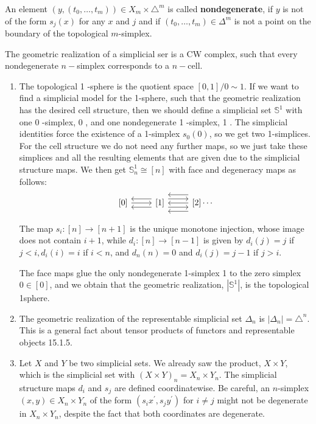 An element $\left(y,\left(t_0, \ldots, t_m\right)\right) \in X_m \times \triangle^m$ is called \textbf{nondegenerate}, if $y$ is not of the form $s_j(x)$ for any $x$ and $j$ and if $\left(t_0, \ldots, t_m\right) \in \Delta^m$ is not a point on the boundary of the topological $m$-simplex.

\begin{prop}
    The geometric realization of a simplicial ser is a CW complex, such that every nondegenerate $n-$simplex corresponds to a $n-$cell.
\end{prop}

\begin{example}
    \begin{enumerate}
        \item The topological 1 -sphere is the quotient space $[0,1] / 0 \sim 1$. If we want to find a simplicial model for the 1-sphere, such that the geometric realization has the desired cell structure, then we should define a simplicial set $\mathbb{S}^1$ with one 0 -simplex, 0 , and one nondegenerate 1 -simplex, 1 . The simplicial identities force the existence of a 1-simplex $s_0(0)$, so we get two 1-simplices. For the cell structure we do not need any further maps, so we just take these simplices and all the resulting elements that are given due to the simplicial structure maps. We then get $\mathbb{S}_n^1 \cong[n]$ with face and degeneracy maps as follows:
$$
\begin{tikzcd}
     {[0]} \ar[r] \ar[r, leftarrow, shift left =2] \ar[r, leftarrow, shift right =2] & {[1]} \ar[r, leftarrow] \ar[r, leftarrow, shift left =4] \ar[r, leftarrow, shift right =4] \ar[r, shift left =2] \ar[r, shift right =2] & {[2]}  \cdots
    \end{tikzcd}
$$
        
        The map $s_i:[n] \rightarrow[n+1]$ is the unique monotone injection, whose image does not contain $i+1$, while $d_i:[n] \rightarrow[n-1]$ is given by $d_i(j)=j$ if $j<i, d_i(i)=i$ if $i<n$, and $d_n(n)=0$ and $d_i(j)=j-1$ if $j>i$.
        
        The face maps glue the only nondegenerate 1-simplex 1 to the zero simplex $0 \in[0]$, and we obtain that the geometric realization, $\left|\mathbb{S}^1\right|$, is the topological 1sphere.
        \item The geometric realization of the representable simplicial set $\Delta_n$ is $\left|\Delta_n\right|=\triangle^n$. This is a general fact about tensor products of functors and representable objects 15.1.5. \item Let $X$ and $Y$ be two simplicial sets. We already saw the product, $X \times Y$, which is the simplicial set with $(X \times Y)_n=X_n \times Y_n$. The simplicial structure maps $d_i$ and $s_j$ are defined coordinatewise. Be careful, an $n$-simplex $(x, y) \in X_n \times Y_n$ of the form $\left(s_i x^{\prime}, s_j y^{\prime}\right)$ for $i \neq j$ might not be degenerate in $X_n \times Y_n$, despite the fact that both coordinates are degenerate.
    \end{enumerate}
\end{example}

